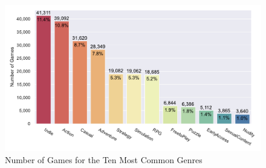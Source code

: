 \begin{figure}[h]
    \centering
    \includegraphics[width=.9\textwidth]{data/results/plots/tags_plot}
    \caption{Number of Games for the Ten Most Common Genres}
    \label{fig:genre_plot}
\end{figure}